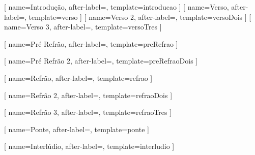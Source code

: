   {
          \ifobeylines
              {\setlength\parskip{0pt}}
              {\vspace*{-\parskip}}%
  }
  {\enddescriptionBoxTwo}

  {
          \ifobeylines
              {\setlength\parskip{0pt}}
              {\vspace*{-\parskip}}%
  }
  {\enddescriptionBoxTwo}

  {
          \ifobeylines
              {\setlength\parskip{0pt}}
              {\vspace*{-\parskip}}%
  }
  {\enddescriptionBoxTwo}

  {
          \ifobeylines
              {\setlength\parskip{0pt}}
              {\vspace*{-\parskip}}%
  }
  {\enddescriptionBox}

[
  name={Introdução},
  after-label=\noindent,
  template=introducao
  ]
[
  name={Verso},
  after-label=\noindent,
  template=verso
  ]
[
  name={Verso 2},
  after-label=\noindent,
  template=versoDois
  ]
[
  name={Verso 3},
  after-label=\noindent,
  template=versoTres
  ]

[
  name={Pré Refrão},
  after-label=\noindent,
  template=preRefrao
  ]

[
  name={Pré Refrão 2},
  after-label=\noindent,
  template=preRefraoDois
  ]

[
  name=Refrão,
  after-label=\noindent,
  template=refrao
  ]

[
  name={Refrão 2},
  after-label=\noindent,
  template=refraoDois
  ]
   
[
  name={Refrão 3},
  after-label=\noindent,
  template=refraoTres
  ]

[
  name=Ponte,
  after-label=\noindent,
  template=ponte
  ]

[
  name=Interlúdio,
  after-label=\noindent,
  template=interludio
  ]

